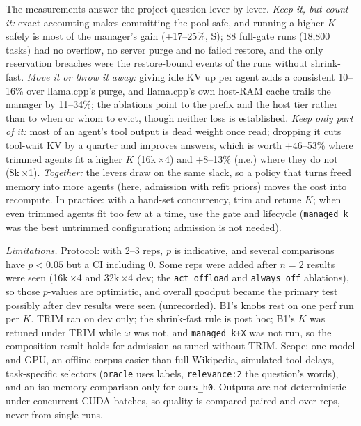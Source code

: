 \documentclass[conference]{IEEEtran}
\newcommand{\K}{$K$}
\newcommand{\x}{$\times$}
\newcommand{\cfg}[1]{\texttt{#1}}
\begin{document}
The measurements answer the project question lever by lever. \emph{Keep it, but count it:} exact
accounting makes committing the pool safe, and running a higher \K{} safely is most of the manager's
gain (+17--25\%, S); 88 full-gate runs (18,800 tasks) had no overflow, no server purge and no failed
restore, and the only reservation breaches were the restore-bound events of the runs without
shrink-fast. \emph{Move it or throw it away:} giving idle KV up per agent adds a consistent 10--16\%
over llama.cpp's purge, and llama.cpp's own host-RAM cache trails the manager by 11--34\%; the
ablations point to the prefix and the host tier rather than to when or whom to evict, though neither
loss is established. \emph{Keep only part of it:} most of
an agent's tool output is dead weight once read; dropping it cuts tool-wait KV by a quarter and
improves answers, which is worth +46--53\% where trimmed agents fit a higher \K{} (16k\,\x4) and +8--13\%
(n.e.) where they do not (8k\,\x1). \emph{Together:} the levers draw on the same slack, so a policy that
turns freed memory into more agents (here, admission with refit priors) moves the cost into
recompute. In practice: with a hand-set concurrency, trim and retune \K; when even trimmed agents fit
too few at a time, use the gate and lifecycle (\cfg{managed\_k} was the best untrimmed configuration;
admission is not needed).

\emph{Limitations.} Protocol: with 2--3 reps, $p$ is indicative, and several comparisons have
$p<0.05$ but a CI including 0. Some reps were added after $n=2$ results were seen (16k\,\x4 and
32k\,\x4 dev; the \cfg{act\_offload} and \cfg{always\_off} ablations), so those $p$-values are
optimistic, and overall goodput became the primary test possibly after dev results were seen
(unrecorded). B1's knobs rest on one perf run per \K. TRIM ran on dev only; the shrink-fast rule is post
hoc; B1's \K{} was retuned under TRIM while $\omega$ was not, and \cfg{managed\_k+X} was not run, so
the composition result holds for admission as tuned without TRIM. Scope: one model and GPU, an offline
corpus easier than full Wikipedia, simulated tool delays, task-specific selectors (\cfg{oracle} uses
labels, \cfg{relevance:2} the question's words), and an iso-memory comparison only for
\cfg{ours\_h0}. Outputs are not deterministic under concurrent CUDA batches, so quality is compared
paired and over reps, never from single runs.

\onecolumn
{}
\vspace{4pt}
\end{document}
